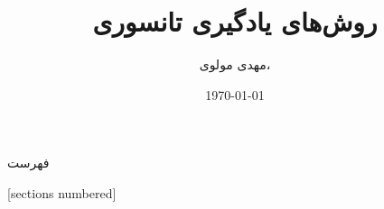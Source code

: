 \documentclass[10pt]{beamer}
\title{روش‌های یادگیری تانسوری}
\date{\today}
\author{مهدی مولوی، }
\institute{استاد راهنما: دکتر منصور رزقی}
\begin{document}
\linespread{1.5}
\maketitle

\begin{frame}{فهرست}

{\small
	   [sections numbered]
  \tableofcontents[hideallsubsections]
}
\end{frame}






\end{document}
